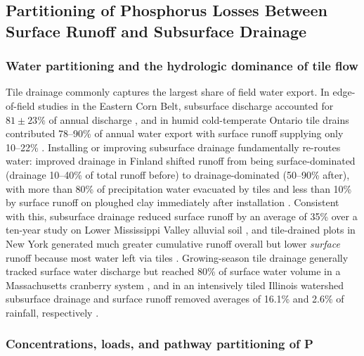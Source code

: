 \documentclass[11pt]{article}
\begin{document}
\subsection{Partitioning of Phosphorus Losses Between Surface Runoff and
Subsurface Drainage}

\subsubsection{Water partitioning and the hydrologic dominance of tile flow}

Tile drainage commonly captures the largest share of field water export. In
edge-of-field studies in the Eastern Corn Belt, subsurface discharge accounted for
$81 \pm 23\%$ of annual discharge \parencite{Pease2018}, and in humid
cold-temperate Ontario tile drains contributed 78--90\% of annual water export
with surface runoff supplying only 10--22\% \parencite{VanEsbroeck2016}. Installing
or improving subsurface drainage fundamentally re-routes water: improved drainage
in Finland shifted runoff from being surface-dominated (drainage 10--40\% of total
runoff before) to drainage-dominated (50--90\% after), with more than 80\% of
precipitation water evacuated by tiles and less than 10\% by surface runoff on
ploughed clay immediately after installation \parencite{Turtola1995}. Consistent
with this, subsurface drainage reduced surface runoff by an average of 35\% over a
ten-year study on Lower Mississippi Valley alluvial soil \parencite{BENGTSON1995},
and tile-drained plots in New York generated much greater cumulative runoff overall
but lower \emph{surface} runoff because most water left via tiles
\parencite{Klaiber2020}. Growing-season tile drainage generally tracked surface
water discharge but reached 80\% of surface water volume in a Massachusetts
cranberry system \parencite{Millar2025}, and in an intensively tiled Illinois
watershed subsurface drainage and surface runoff removed averages of 16.1\% and
2.6\% of rainfall, respectively \parencite{Algoazany2007}.

\subsubsection{Concentrations, loads, and pathway partitioning of P}
\end{document}
